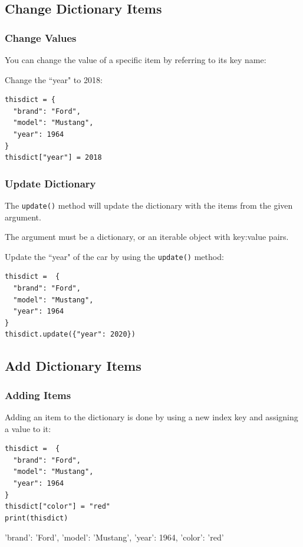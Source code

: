 \documentclass[12pt,a4paper]{article}
\newcommand{\code}[1]{%
	\colorbox{backcolour}{\lstinline{#1}}%
}
\newcommand{\lcode}[1]{%
	\lstinline{#1}%
}
\begin{document}
\subsection{Change Dictionary Items}

\subsubsection{Change Values}

You can change the value of a specific item by referring to its key name:

\begin{ebox}
Change the ``year" to 2018:
	\begin{lstlisting}
thisdict = {
  "brand": "Ford",
  "model": "Mustang",
  "year": 1964
}
thisdict["year"] = 2018
	\end{lstlisting}
\end{ebox}
\subsubsection{Update Dictionary}

The \code{update()} method will update the dictionary with the items from the
given argument.

The argument must be a dictionary, or an iterable object with key:value pairs.

\begin{ebox}
Update the ``year" of the car by using the \lcode{update()} method:
	\begin{lstlisting}
thisdict =	{
  "brand": "Ford",
  "model": "Mustang",
  "year": 1964
}
thisdict.update({"year": 2020})
	\end{lstlisting}
\end{ebox}
\subsection{Add Dictionary Items}

\subsubsection{Adding Items}

Adding an item to the dictionary is done by using a new index key and assigning
a value to it:

\begin{ebox}
	\begin{lstlisting}
thisdict =	{
  "brand": "Ford",
  "model": "Mustang",
  "year": 1964
}
thisdict["color"] = "red"
print(thisdict)
	\end{lstlisting}
\tcblower
	\begin{vercode}
{'brand': 'Ford', 'model': 'Mustang', 'year': 1964, 'color': 'red'}
	\end{vercode}
\end{ebox}
\end{document}
